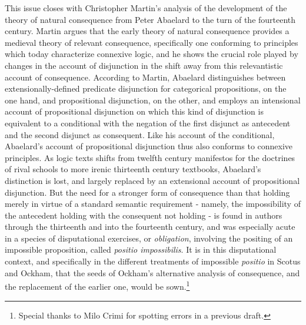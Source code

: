 \documentclass[]{article}
\begin{document}
This issue closes with Christopher Martin's analysis of the development of the theory of natural consequence from Peter Abaelard to the turn of the fourteenth century. Martin argues that the early theory of natural consequence provides a medieval theory of relevant consequence, specifically one conforming to principles which today characterize connexive logic, and he shows the crucial role played by changes in the account of disjunction in the shift away from this relevantistic account of consequence. According to Martin, Abaelard distinguishes between extensionally-defined predicate disjunction for categorical propositions, on the one hand, and propositional disjunction, on the other, and employs an intensional account of propositional disjunction on which this kind of disjunction is equivalent to a conditional with the negation of the first disjunct as antecedent and the second disjunct as consequent. Like his account of the conditional, Abaelard's account of propositional disjunction thus also conforms to connexive principles. As logic texts shifts from twelfth century manifestos for the doctrines of rival schools to more irenic thirteenth century textbooks, Abaelard's distinction is lost, and largely replaced by an extensional account of propositional disjunction. But the need for a stronger form of consequence than that holding merely in virtue of a standard semantic requirement - namely, the impossibility of the antecedent holding with the consequent not holding - is found in authors through the thirteenth and into the fourteenth century, and was especially acute in a species of disputational exercises, or \textit{obligation}, involving the positing of an impossible proposition, called \textit{positio impossibilis}. It is in this disputational context, and specifically in the different treatments of impossible \textit{positio} in Scotus and Ockham, that the seeds of Ockham's alternative analysis of consequence, and the replacement of the earlier one, would be sown.\footnote{Special thanks to Milo Crimi for spotting errors in a previous draft.}

\end{document}
